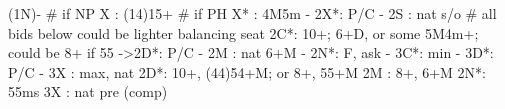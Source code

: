 (1N)-
# if NP
X  : (14)15+
# if PH
X* : 4M5m
   - 2X*: P/C
   - 2S : nat s/o
# all bids below could be lighter balancing seat
2C*: 10+; 6+D, or some 5M4m+; could be 8+ if 55
   ->2D*: P/C
   - 2M : nat 6+M
   - 2N*: F, ask
        - 3C*: min
             - 3D*: P/C
        - 3X : max, nat
2D*: 10+, (44)54+M; or 8+, 55+M
2M : 8+, 6+M
2N*: 55ms
3X : nat pre (comp)
